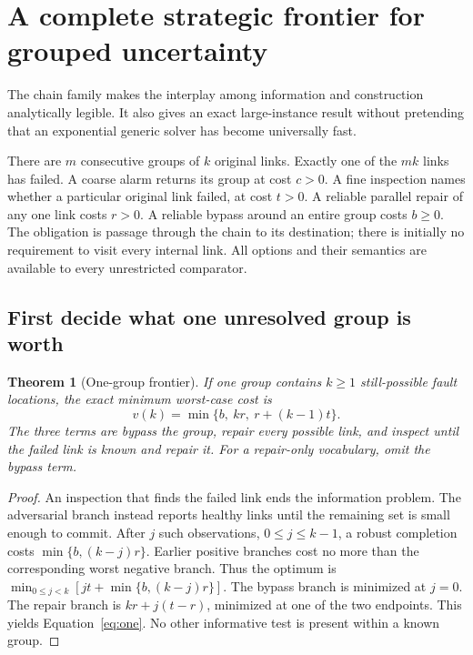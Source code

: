 \documentclass[11pt,letterpaper]{article}
\newtheorem{theorem}{Theorem}[section]
\theoremstyle{remark}\newtheorem{remark}{Remark}[section]
\begin{document}
\section{A complete strategic frontier for grouped uncertainty}
\label{sec:frontier}
The chain family makes the interplay among information and construction analytically legible. It also gives an exact large-instance result without pretending that an exponential generic solver has become universally fast.

There are $m$ consecutive groups of $k$ original links. Exactly one of the $mk$ links has failed. A coarse alarm returns its group at cost $c>0$. A fine inspection names whether a particular original link failed, at cost $t>0$. A reliable parallel repair of any one link costs $r>0$. A reliable bypass around an entire group costs $b\ge0$. The obligation is passage through the chain to its destination; there is initially no requirement to visit every internal link. All options and their semantics are available to every unrestricted comparator.

\subsection{First decide what one unresolved group is worth}
\begin{theorem}[One-group frontier]\label{thm:one}
If one group contains $k\ge1$ still-possible fault locations, the exact minimum worst-case cost is
\begin{equation}\label{eq:one}
v(k)=\min\{b,\ kr,\ r+(k-1)t\}.
\end{equation}
The three terms are bypass the group, repair every possible link, and inspect until the failed link is known and repair it. For a repair-only vocabulary, omit the bypass term.
\end{theorem}
\begin{proof}
An inspection that finds the failed link ends the information problem. The adversarial branch instead reports healthy links until the remaining set is small enough to commit. After $j$ such observations, $0\le j\le k-1$, a robust completion costs $\min\{b,(k-j)r\}$. Earlier positive branches cost no more than the corresponding worst negative branch. Thus the optimum is
$\min_{0\le j<k}[jt+\min\{b,(k-j)r\}]$.
The bypass branch is minimized at $j=0$. The repair branch is $kr+j(t-r)$, minimized at one of the two endpoints. This yields Equation~\eqref{eq:one}. No other informative test is present within a known group.
\end{proof}
\end{document}
